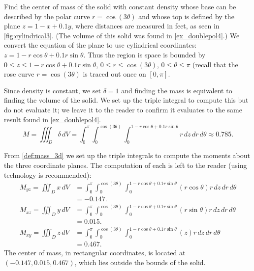 \begin{example}\label{ex_cylindrical3}
Find
%
%
the center of mass of the solid with constant density whose base can be described by the polar curve $r=\cos(3\theta)$ and whose top is defined by the plane $z=1-x+0.1y$, where distances are measured in feet, as seen in \autoref{fig:cylindrical3}. (The volume of this solid was found in \autoref{ex_doublepol4}.)
\solution
We convert the equation of the plane to use cylindrical coordinates: $z= 1-r\cos\theta+0.1r\sin\theta$. Thus the region is space is bounded by $0 \leq z \leq 1-r\cos\theta + 0.1r\sin\theta$, $0 \leq r \leq \cos(3\theta)$, $0 \leq \theta \leq \pi$ (recall that the rose curve $r=\cos(3\theta)$ is traced out once on $[0,\pi]$.

Since density is constant, we set $\delta = 1$ and finding the mass is equivalent to finding the volume of the solid. We set up the triple integral to compute this but do not evaluate it; we leave it to the reader to confirm it evaluates to the same result found in \autoref{ex_doublepol4}.
\[
M = \iiint_D\delta \, dV = \int_0^{\pi}\int_0^{\cos(3\theta)}\int_0^{1-r\cos\theta+0.1r\sin\theta} r\,dz\,dr\,d\theta \approx 0.785.
\]

From \autoref{def:mass_3d} we set up the triple integrals to compute the moments about the three coordinate planes. The computation of each is left to the reader (using technology is recommended):
\begin{align*}
M_{yz} = \iiint_D x\,dV &= \int_0^{\pi}\int_0^{\cos(3\theta)}\int_0^{1-r\cos\theta+0.1r\sin\theta} (r\cos\theta) r\,dz\,dr\,d\theta\\
&= -0.147.
\\
M_{xz} = \iiint_D y\,dV &= \int_0^{\pi}\int_0^{\cos(3\theta)}\int_0^{1-r\cos\theta+0.1r\sin\theta} (r\sin\theta) r\,dz\,dr\,d\theta\\
&= 0.015.\\
M_{xy} = \iiint_D z\,dV &= \int_0^{\pi}\int_0^{\cos(3\theta)}\int_0^{1-r\cos\theta+0.1r\sin\theta} (z) r\,dz\,dr\,d\theta\\
 &= 0.467.
\end{align*}
The center of mass, in rectangular coordinates,  is located at $(-0.147,0.015,0.467)$, which lies outside the bounds of the solid.
\end{example}

